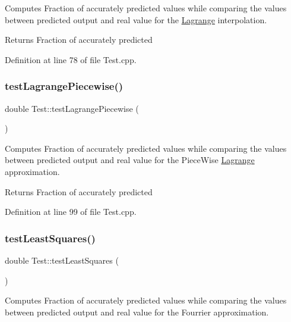 Computes Fraction of accurately predicted values while comparing the values between predicted output and real value for the \mbox{\hyperlink{class_lagrange}{Lagrange}} interpolation. 

\begin{DoxyReturn}{Returns}
Fraction of accurately predicted 
\end{DoxyReturn}


Definition at line 78 of file Test.\+cpp.

\mbox{\label{class_test_a3dd2e280b828fac8d1509d04d46ddb84}} 
\subsubsection{\texorpdfstring{test\+Lagrange\+Piecewise()}{testLagrangePiecewise()}}
{\footnotesize\ttfamily double Test\+::test\+Lagrange\+Piecewise (\begin{DoxyParamCaption}{ }\end{DoxyParamCaption})}



Computes Fraction of accurately predicted values while comparing the values between predicted output and real value for the Piece\+Wise \mbox{\hyperlink{class_lagrange}{Lagrange}} approximation. 

\begin{DoxyReturn}{Returns}
Fraction of accurately predicted 
\end{DoxyReturn}


Definition at line 99 of file Test.\+cpp.

\mbox{\label{class_test_a822cf87174e675d0c0f3e2c9d4d8344b}} 
\subsubsection{\texorpdfstring{test\+Least\+Squares()}{testLeastSquares()}}
{\footnotesize\ttfamily double Test\+::test\+Least\+Squares (\begin{DoxyParamCaption}{ }\end{DoxyParamCaption})}



Computes Fraction of accurately predicted values while comparing the values between predicted output and real value for the Fourrier approximation. 

